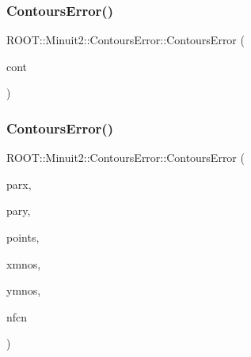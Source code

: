 \subsubsection{\texorpdfstring{ContoursError()}{ContoursError()}\hspace{0.1cm}{\footnotesize\ttfamily [2/6]}}
{\footnotesize\ttfamily R\+O\+O\+T\+::\+Minuit2\+::\+Contours\+Error\+::\+Contours\+Error (\begin{DoxyParamCaption}\item[{const \mbox{\hyperlink{classROOT_1_1Minuit2_1_1ContoursError}{Contours\+Error}} \&}]{cont }\end{DoxyParamCaption})\hspace{0.3cm}{\ttfamily [inline]}}

\mbox{\label{classROOT_1_1Minuit2_1_1ContoursError_abe494ac0098e41bf38fd4023e018e340}} 
\subsubsection{\texorpdfstring{ContoursError()}{ContoursError()}\hspace{0.1cm}{\footnotesize\ttfamily [3/6]}}
{\footnotesize\ttfamily R\+O\+O\+T\+::\+Minuit2\+::\+Contours\+Error\+::\+Contours\+Error (\begin{DoxyParamCaption}\item[{unsigned int}]{parx,  }\item[{unsigned int}]{pary,  }\item[{const std\+::vector$<$ std\+::pair$<$ double, double $>$ $>$ \&}]{points,  }\item[{const \mbox{\hyperlink{classROOT_1_1Minuit2_1_1MinosError}{Minos\+Error}} \&}]{xmnos,  }\item[{const \mbox{\hyperlink{classROOT_1_1Minuit2_1_1MinosError}{Minos\+Error}} \&}]{ymnos,  }\item[{unsigned int}]{nfcn }\end{DoxyParamCaption})\hspace{0.3cm}{\ttfamily [inline]}}

\mbox{\label{classROOT_1_1Minuit2_1_1ContoursError_a712a4699d5a022af68106524be05d862}} 
